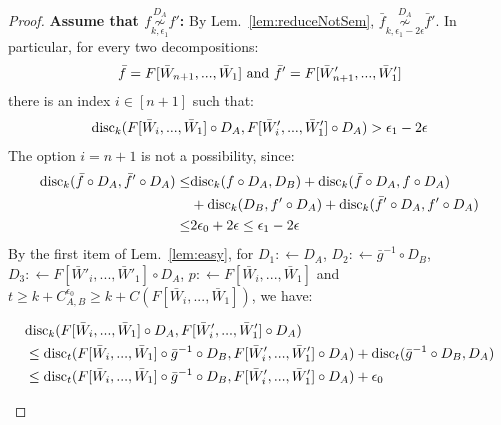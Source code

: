 \documentclass{article} %
\newcommand{\disc}{\textnormal{disc}}
\begin{document}
\begin{proof}
\textbf{Assume that $f \overset{D_A}{\underset{k,\epsilon_1}{\not\sim}} f'$:} By Lem.~\ref{lem:reduceNotSem}, $\bar{f} \overset{D_A}{\underset{k,\epsilon_1-2\epsilon}{\not\sim}} \bar{f}'$. In particular, for every two decompositions:
\begin{equation}
\bar{f} = F[\bar{W}_{n+1},...,\bar{W}_1] \textnormal{ and } 
\bar{f}' = F[\bar{W}'_{n+1},...,\bar{W}'_1]
\end{equation}
there is an index $i \in [n+1]$ such that:
\begin{equation}
\begin{aligned}
&\disc_k(F[\bar{W}_{i},...,\bar{W}_1] \circ D_A,F[\bar{W}'_{i},...,\bar{W}'_1] \circ D_A) > \epsilon_1-2\epsilon \\
\end{aligned}
\end{equation}
The option $i=n+1$ is not a possibility, since:
\begin{equation}\label{eq:notApossibilityn1}
\begin{aligned}
\disc_k(\bar{f} \circ D_A, \bar{f}' \circ D_A)\leq & \disc_k(f \circ D_A, D_B) + \disc_k(\bar{f}\circ D_A,f \circ D_A) \\
&+ \disc_k(D_B,f' \circ D_A) + \disc_k(\bar{f}'\circ D_A,f' \circ D_A)  \\
\leq& 2\epsilon_0+2\epsilon \leq \epsilon_1 - 2\epsilon
\end{aligned}
\end{equation}
By the first item of Lem.~\ref{lem:easy}, for $D_1 :\leftarrow D_A$, $D_2:\leftarrow \bar{g}^{-1} \circ D_B$, $D_3 :\leftarrow F[\bar{W}'_{i},...,\bar{W}'_1]\circ D_A$, $p:\leftarrow F[\bar{W}_{i},...,\bar{W}_1]$ and $t \geq k + C^{\epsilon_0}_{A,B} \geq k + C(F[\bar{W}_{i},...,\bar{W}_1])$, we have:
\begin{small}
\begin{equation}
\begin{aligned}
&\disc_k(F[\bar{W}_{i},...,\bar{W}_1]\circ D_A,F[\bar{W}'_{i},...,\bar{W}'_1] \circ D_A) \\
&\leq \disc_t(F[\bar{W}_{i},...,\bar{W}_1] \circ \bar{g}^{-1} \circ D_B,F[\bar{W}'_{i},...,\bar{W}'_1] \circ D_A) + \disc_t( \bar{g}^{-1} \circ D_B,D_A) \\
&\leq \disc_t(F[\bar{W}_{i},...,\bar{W}_1] \circ \bar{g}^{-1} \circ D_B,F[\bar{W}'_{i},...,\bar{W}'_1] \circ D_A) +\epsilon_0 \\
\end{aligned}
\end{equation}
\end{small}

\end{proof}
\end{document}
